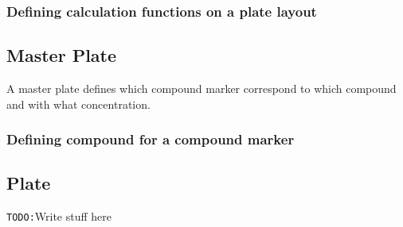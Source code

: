 \documentclass[a4paper,10pt]{article}
\begin{document}
            \subsubsection{Defining calculation functions on a plate layout}

        \subsection{Master Plate}
            A master plate defines which compound marker correspond to which
            compound and with what concentration.
            
            \subsubsection{Defining compound for a compound marker}

        \subsection{Plate}
        \texttt{TODO:}Write stuff here
\end{document}
